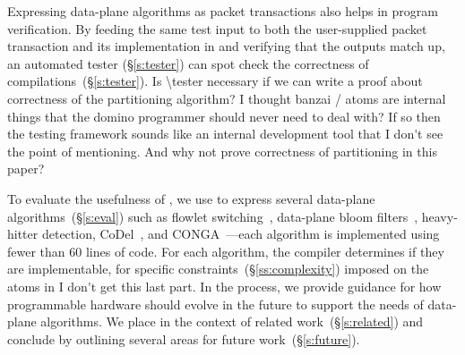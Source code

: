 
Expressing data-plane algorithms as packet transactions also helps in program
verification.  By feeding the same test input to both
the user-supplied packet transaction and its implementation in \absmachine and
verifying that the outputs match up, an automated tester (\S\ref{s:tester}) can
spot check the correctness of compilations~(\S\ref{s:tester}).
\ac{Is \tester necessary if we can write
a proof about correctness of the partitioning algorithm?} 
\ac{I thought banzai / atoms are internal things that the 
domino programmer should never need to deal with? If so then the 
testing framework sounds like an internal
development tool that I don't see the point of mentioning. And why not
prove correctness of partitioning in this paper?}


To evaluate the usefulness of \pktlanguage, we use \pktlanguage to express
several data-plane algorithms~(\S\ref{s:eval}) such as flowlet
switching~\cite{flowlets}, data-plane bloom filters~\cite{bloom}, heavy-hitter
detection, CoDel~\cite{codel}, and CONGA~\cite{conga}---each algorithm is
implemented using fewer than 60 lines
of \pktlanguage code. For each algorithm, the \pktlanguage compiler determines
if they are implementable, for specific constraints~(\S\ref{ss:complexity})
imposed on the atoms in \absmachine \ac{I don't get this last part}. 
In the process, we provide guidance for
how programmable hardware should evolve in the future to support the needs of
data-plane algorithms.  We place \pktlanguage in the context of related
work~(\S\ref{s:related}) and conclude by outlining several areas for future
work~(\S\ref{s:future}).
